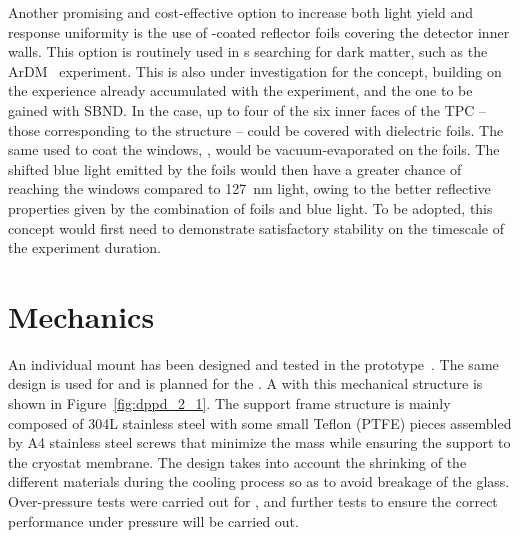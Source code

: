 Another promising and cost-effective option to increase both light yield and response uniformity is the use of -coated reflector foils covering the detector inner walls. This option is routinely used in \dual \lartpc{}s searching for dark matter, such as the ArDM~\cite{Boccone:2009z} experiment. 
This is also under investigation for the  concept, building on the experience already accumulated with the \lariat experiment, and the one to be gained with SBND. In the \dual case, up to four of the six inner faces of the TPC -- those corresponding to the  structure -- could be covered with dielectric foils. The same  used to coat the  windows, , would be vacuum-evaporated on the foils. The shifted blue light emitted by the foils would then have a greater chance of reaching the  windows compared to \SI{127}{nm} light, owing to the better reflective properties given by the combination of foils and blue light. To be adopted, %
this concept would first need to demonstrate satisfactory stability on the timescale of the experiment duration.

\section{Mechanics}
\label{sec:fddp-pd-3}


An individual  mount has been designed and tested in the   %
prototype~\cite{Zambelli:2017dkg}. The same design is used for  and is planned %
for the . A  with this mechanical structure is shown in Figure~\ref{fig:dppd_2_1}. The support frame structure is mainly composed of \num{304}L stainless steel with some small Teflon (PTFE) pieces assembled by A4 stainless steel screws that minimize the mass while ensuring the  support to the cryostat membrane. The design %
takes into account the shrinking of the different materials during the cooling process so as to avoid breakage of the  glass.
Over-pressure tests were carried out for , and further tests to ensure the correct performance under pressure will be carried out.

